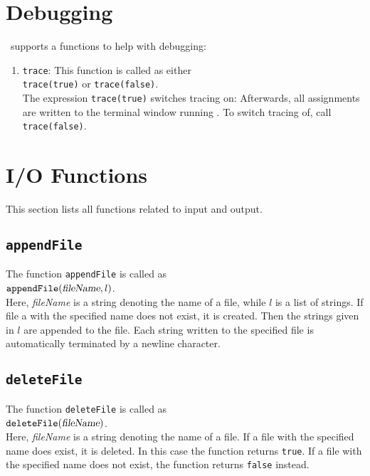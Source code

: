 \section{Debugging}
\setlx\ supports a functions to help with debugging:
\begin{enumerate}
\item \texttt{trace}:  This function is called as either
      \\[0.2cm]
      \hspace*{1.3cm}
      \texttt{trace(true)} \quad or \quad \texttt{trace(false)}.
      \\[0.2cm]
      The expression \texttt{trace(true)} switches tracing on:  Afterwards, all
      assignments are written to the terminal window running \setlx.  To switch tracing
      of, call \texttt{trace(false)}.
\end{enumerate}


\section{I/O Functions}
This  section lists all functions related to input and output.

\subsection{\texttt{appendFile}}
The function \texttt{appendFile} is called as
\\[0.2cm]
\hspace*{1.3cm}
$\mathtt{appendFile}(\textsl{fileName}, l)$.
\\[0.2cm]
Here, \textsl{fileName} is a string denoting the name of a file, while $l$ is a list of
strings.  If file a with the specified name does not exist, it is created.  Then the strings
given in $l$ are appended to the file.   Each string written to the specified file is
automatically  terminated by a newline character.

\subsection{\texttt{deleteFile}}
The function \texttt{deleteFile} is called as
\\[0.2cm]
\hspace*{1.3cm}
$\mathtt{deleteFile}(\textsl{fileName})$.
\\[0.2cm]
Here, \textsl{fileName} is a string denoting the name of a file.
If a file with the specified name does exist, it is deleted.  In this case the function
returns \texttt{true}.  If a file with the specified name does not exist, the function
returns \texttt{false} instead.

